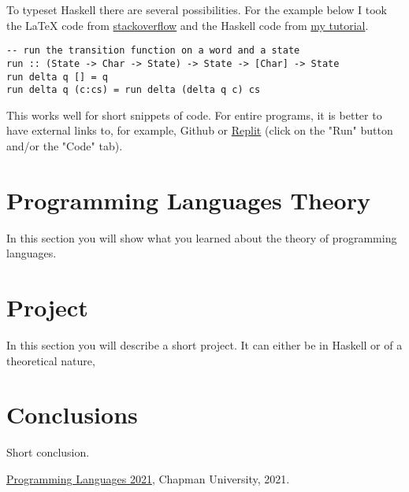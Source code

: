 \documentclass{article}
\begin{document}
\medskip\noindent
To typeset Haskell there are several possibilities. For the example below I took the LaTeX code from \href{https://stackoverflow.com/a/3175141/4600290}{stackoverflow} and the Haskell code from \href{https://hackmd.io/@alexhkurz/HylLKujCP}{my tutorial}.

\begin{lstlisting}
-- run the transition function on a word and a state
run :: (State -> Char -> State) -> State -> [Char] -> State
run delta q [] = q
run delta q (c:cs) = run delta (delta q c) cs
\end{lstlisting}

\medskip\noindent
This works well for short snippets of code. For entire programs, it is better to have external links to, for example, Github or \href{https://replit.com/@alexhkurz/automata01#main.hs}{Replit} (click on the "Run" button and/or the "Code" tab).


\section{Programming Languages Theory}

In this section you will show what you learned about the theory of programming languages.

\section{Project}

In this section you will describe a short project. It can either be in Haskell or of a theoretical nature,

\section{Conclusions}\label{conclusions}
Short conclusion.

\begin{thebibliography}{99}
 \href{https://github.com/alexhkurz/programming-languages-2021/blob/main/README.md}{Programming Languages 2021}, Chapman University, 2021.
\end{thebibliography}
\end{document}
